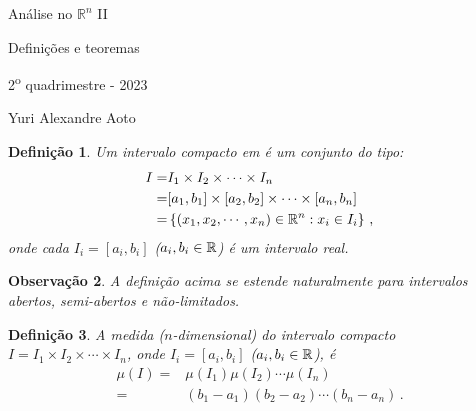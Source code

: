 \documentclass[a4paper,12pt]{extreport}
\newtheorem{mydef}{Definição}
\newtheorem{myobs}[mydef]{Observação}
\newif\ifspacesbetweentheos
\newcommand{\theospace}[1]{
\ifspacesbetweentheos
  \vspace{#1}
\fi
}
\newcommand{\theonewpage}{
\ifspacesbetweentheos
  \newpage
\fi
}
\begin{document}
\begin{center}
  {\LARGE Análise no $\mathbb{R}^n$ II}\vspace{0.5cm}

  {\LARGE Definições e teoremas}\vspace{0.5cm}

  {2\textsuperscript{o} quadrimestre - 2023}

  {Yuri Alexandre Aoto}
\end{center}


\begin{mydef}
  Um \emph{intervalo compacto} em \rn{} é um conjunto do tipo:
  \begin{equation}
    \begin{split}
      I =& I_1 \times I_2 \times \cdots \times I_n\\
      =& [a_1, b_1] \times [a_2, b_2] \times \cdots \times [a_n, b_n]\\
      =& \left\{ (x_1, x_2, \cdots, x_n) \in \mathbb{R}^n : x_i \in I_i \right\}\,,
    \end{split}
  \end{equation}
  onde cada $I_i = [a_i, b_i]$ ($a_i, b_i \in \mathbb{R}$)
  é um intervalo real.
\end{mydef}

\begin{myobs}
  A definição acima se estende naturalmente para intervalos abertos,
  semi-abertos e não-limitados.
\end{myobs}

\theospace{6.0cm}


\begin{mydef}
  A medida ($n$-dimensional) do intervalo compacto
  $I = I_1 \times I_2 \times \cdots \times I_n$,
  onde $I_i = [a_i, b_i]$ ($a_i, b_i \in \mathbb{R}$),
  é
  \begin{equation}
    \begin{split}
      \mu(I) =& \mu(I_1)\mu(I_2) \cdots \mu(I_n)\\
      =& (b_1 - a_1)(b_2 - a_2) \cdots (b_n - a_n)\,.
    \end{split}
  \end{equation}
\end{mydef}

\theonewpage
\end{document}

